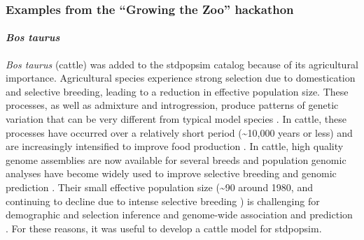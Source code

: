 \documentclass[hidelinks]{article}
\begin{document}
\hypertarget{examples-from-the-growing-the-zoo-hackathon}{%
\subsubsection*{Examples from the ``Growing the Zoo''
hackathon}\label{examples-from-the-growing-the-zoo-hackathon}}

\hypertarget{bos-taurus}{%
\paragraph{\texorpdfstring{\emph{Bos
taurus}}{Bos taurus}}\label{bos-taurus}}

\emph{Bos taurus} (cattle) was added to the stdpopsim catalog 
because of its agricultural importance. Agricultural species experience
strong selection due to domestication and selective breeding, leading
to a reduction in effective population size. These processes,
as well as admixture and introgression, produce patterns
of genetic variation that can be very different from typical model
species \citep{Larson2013}. In cattle, these processes have occurred over a
relatively short period (\textasciitilde 10,000 years or less) and are
increasingly intensified to improve food production \citep{Gaut2018,
MacLeod2013}. In cattle, high quality genome assemblies are now
available for several breeds \citep[e.g.,][]{Rosen2020, Heaton2021,
Talenti2022} and population genomic analyses have become widely used to
improve selective breeding and genomic prediction \citep{Meuwissen2001,
MacLeod2014, Obsteter2021}. Their small effective population size
(\textasciitilde 90 around 1980, and continuing to decline due to intense
selective breeding \citep{MacLeod2013, VanRaden2020, Makanjouloa2020}) is
challenging for demographic and selection inference \citep{MacLeod2013,
Hartfield2022} and genome-wide association and prediction
\citep{MacLeod2014}. For these reasons, it was useful to develop a
cattle model for stdpopsim.
\end{document}
